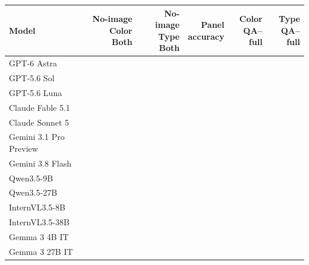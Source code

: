 \begin{tabular}{@{}lrrrrr@{}}
\toprule
Model & \shortstack{No-image\\Color Both} & \shortstack{No-image\\Type Both} & \shortstack{Panel\\accuracy} & \shortstack{Color\\QA--full} & \shortstack{Type\\QA--full}\\
\midrule
GPT-6 Astra &  &  &  &  & \\
GPT-5.6 Sol &  &  &  &  & \\
GPT-5.6 Luna &  &  &  &  & \\
Claude Fable 5.1 &  &  &  &  & \\
Claude Sonnet 5 &  &  &  &  & \\
Gemini 3.1 Pro Preview &  &  &  &  & \\
Gemini 3.8 Flash &  &  &  &  & \\
Qwen3.5-9B &  &  &  &  & \\
Qwen3.5-27B &  &  &  &  & \\
InternVL3.5-8B &  &  &  &  & \\
InternVL3.5-38B &  &  &  &  & \\
Gemma 3 4B IT &  &  &  &  & \\
Gemma 3 27B IT &  &  &  &  & \\
\bottomrule
\end{tabular}
